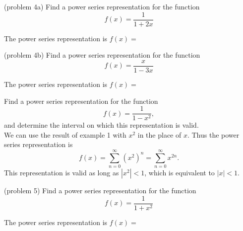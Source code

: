 \documentclass[handout]{ximera}
\begin{document}
\begin{problem}(problem 4a)
Find a power series representation for the function
\[
f(x) = \frac{1}{1+ 2x}
\]

The power series representation is $f(x) = $
\begin{multipleChoice}
\end{multipleChoice}
\end{problem}




\begin{problem}(problem 4b)
Find a power series representation for the function
\[
f(x) = \frac{x}{1-3x}
\]

The power series representation is $f(x) = $
\begin{multipleChoice}
\end{multipleChoice}
\end{problem}



\begin{example}[example 5]
Find a power series representation for the function
\[
f(x) = \frac{1}{1-x^2},
\]
and determine the interval on which this representation is valid.\\
We can use the result of example 1 with $x^2$ in the place of $x$.
Thus the power series representation is
\[
f(x) = \sum_{n=0}^\infty (x^2)^n  = \sum_{n=0}^\infty x^{2n}. 
\]
This representation is valid as long as $|x^2| < 1$, which is equivalent to $|x| < 1$.

\end{example}


\begin{problem}(problem 5)
Find a power series representation for the function
\[
f(x) = \frac{1}{1+x^2}
\]

The power series representation is $f(x) = $
\begin{multipleChoice}
\end{multipleChoice}
\end{problem}
\end{document}
